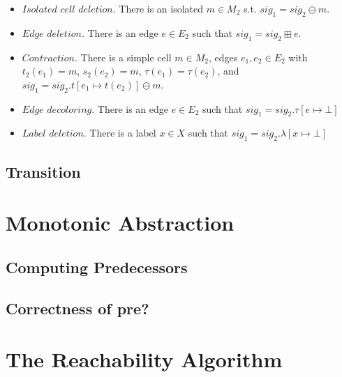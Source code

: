 \begin{itemize}

	\item $Isolated$ $cell$ $deletion$. There is an isolated $m \in M_2$ s.t. $sig_1 = sig_2 \ominus m$.
	\item $Edge$ $deletion$. There is an edge $e \in E_2$ such that $sig_1 = sig_2 \boxplus e$.
	\item $Contraction$. There is a simple cell $m \in M_2$, edges $e_1,e_2 \in E_2$ with $t_2(e_1) = m$,
		  $s_2(e_2) = m$, $\tau(e_1) = \tau(e_2)$, and $sig_1 = sig_2.t[e_1 \mapsto t(e_2)] \ominus m$. 
	\item $Edge$ $decoloring$. There is an edge $e \in E_2$ such that $sig_1 = sig_2.\tau[e \mapsto \bot]$
	\item $Label$ $deletion$. There is a label $x \in X$ such that $sig_1 = sig_2.\lambda[x \mapsto \bot]$

\end{itemize}



\subsection{Transition}





\section{Monotonic Abstraction}

\subsection{Computing Predecessors}

\subsection{Correctness of pre?}

\section{The Reachability Algorithm}



